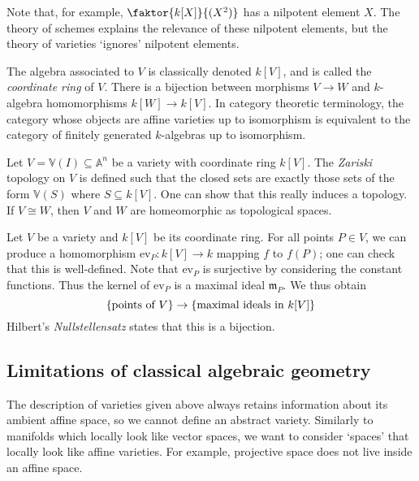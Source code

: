 Note that, for example, \( \faktor{k[X]}{(X^2)} \) has a nilpotent element \( X \).
The theory of schemes explains the relevance of these nilpotent elements, but the theory of varieties `ignores' nilpotent elements.

The algebra associated to \( V \) is classically denoted \( k[V] \), and is called the \emph{coordinate ring} of \( V \).
There is a bijection between morphisms \( V \to W \) and \( k \)-algebra homomorphisms \( k[W] \to k[V] \).
In category theoretic terminology, the category whose objects are affine varieties up to isomorphism is equivalent to the category of finitely generated \( k \)-algebras up to isomorphism.

Let \( V = \mathbb V(I) \subseteq \mathbb A^n \) be a variety with coordinate ring \( k[V] \).
The \emph{Zariski} topology on \( V \) is defined such that the closed sets are exactly those sets of the form \( \mathbb V(S) \) where \( S \subseteq k[V] \).
One can show that this really induces a topology.
If \( V \cong W \), then \( V \) and \( W \) are homeomorphic as topological spaces.

Let \( V \) be a variety and \( k[V] \) be its coordinate ring.
For all points \( P \in V \), we can produce a homomorphism \( \mathrm{ev}_P : k[V] \to k \) mapping \( f \) to \( f(P) \); one can check that this is well-defined.
Note that \( \mathrm{ev}_P \) is surjective by considering the constant functions.
Thus the kernel of \( \mathrm{ev}_P \) is a maximal ideal \( \mathfrak m_P \).
We thus obtain
\[ \qty{\text{points of } V} \to \qty{\text{maximal ideals in } k[V]} \]
Hilbert's \emph{Nullstellensatz} states that this is a bijection.

\subsection{Limitations of classical algebraic geometry}
The description of varieties given above always retains information about its ambient affine space, so we cannot define an abstract variety.
Similarly to manifolds which locally look like vector spaces, we want to consider `spaces' that locally look like affine varieties.
For example, projective space does not live inside an affine space.

